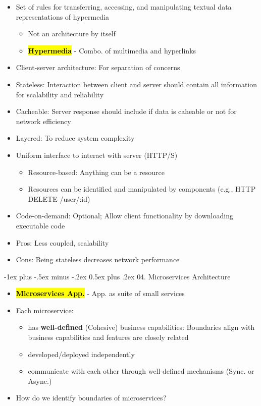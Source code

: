 \documentclass{article}
\makeatletter
\renewcommand{\section}{\@startsection{section}{1}{0mm}%
    {-1ex plus -.5ex minus -.2ex}%
    {0.5ex plus .2ex}%
{\normalfont\large\bfseries}}
\newcommand{\keyword}[2]{\sethlcolor{highlight}\hl{\textbf{#1}} - #2}
\makeatother
\begin{document}
\begin{multicols*}{4}
\begin{itemize}
    \item Set of rules for transferring, accessing, and manipulating textual data representations of hypermedia
    \begin{itemize}
        \item Not an architecture by itself
        \item \keyword{Hypermedia}{Combo. of multimedia and hyperlinks}
    \end{itemize}
    \item Client-server architecture: For separation of concerns
    \item Stateless: Interaction between client and server should contain all information for scalability and reliability
    \item Cacheable: Server response should include if data is caheable or not for network efficiency
    \item Layered: To reduce system complexity
    \item Uniform interface to interact with server (HTTP/S)
    \begin{itemize}
        \item Resource-based: Anything can be a resource
        \item Resources can be identified and manipulated by components (e.g., HTTP DELETE /user/:id)
    \end{itemize}
    \item Code-on-demand: Optional; Allow client functionality by downloading executable code
    \item Pros: Less coupled, scalability
    \item Cons: Being stateless decreases network performance
\end{itemize}

\section{04. Microservices Architecture}

\begin{itemize}
    \item \keyword{Microservices App.}{App. as suite of small services}
    \item Each microservice:
    \begin{itemize}
        \item has \textbf{well-defined} (Cohesive) business capabilities: Boundaries align with business capabilities and features are closely related
        \item developed/deployed independently
        \item communicate with each other through well-defined mechanisms (Sync. or Async.)
    \end{itemize}
    \item How do we identify boundaries of microservices?
\end{itemize}


\end{multicols*}
\end{document}
